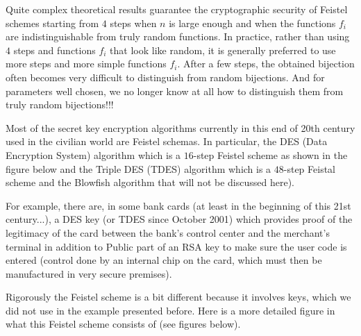 	\pagebreak
	Quite complex theoretical results guarantee the cryptographic security of Feistel schemes starting from $4$ steps when $n$ is large enough and when the functions $f_i$ are indistinguishable from truly random functions. In practice, rather than using $4$ steps and functions $f_i$ that look like random, it is generally preferred to use more steps and more simple functions $f_i$. After a few steps, the obtained bijection often becomes very difficult to distinguish from random bijections. And for parameters well chosen, we no longer know at all how to distinguish them from truly random bijections!!!

	Most of the secret key encryption algorithms currently in this end of 20th century used in the civilian world are Feistel schemas. In particular, the DES (Data Encryption System) algorithm  which is a $16$-step Feistel scheme as shown in the figure below and the Triple DES (TDES) algorithm which is a $48$-step Feistal scheme and the Blowfish algorithm that will not be discussed here).
	
	\begin{tcolorbox}[title=Remark,colframe=black,arc=10pt]
	For example, there are, in some bank cards (at least in the beginning of this 21st century...), a DES key (or TDES since October 2001) which provides proof of the legitimacy of the card between the bank's control center and the merchant's terminal in addition to Public part of an RSA key to make sure the user code is entered (control done by an internal chip on the card, which must then be manufactured in very secure premises).
	\end{tcolorbox}
	Rigorously the Feistel scheme is a bit different because it involves keys, which we did not use in the example presented before. Here is a more detailed figure in what this Feistel scheme consists of (see figures below).

